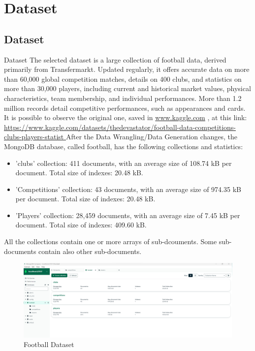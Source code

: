 \documentclass{Configuration_Files/PoliMi3i_thesis}
\begin{document}
\chapter{Dataset}
\label{ch:chapter_three}%

\section{Dataset}

Dataset
The selected dataset is a large collection of football data, derived primarily from Transfermarkt. Updated regularly, it offers accurate data on more than 60,000 global competition matches, details on 400 clubs, and statistics on more than 30,000 players, including current and historical market values, physical characteristics, team membership, and individual performances. More than 1.2 million records detail competitive performances, such as appearances and cards. It is possible to observe the original one, saved in \url{www.kaggle.com} , at this link:
\url{https://www.kaggle.com/datasets/thedevastator/football-data-competitions-clubs-players-statist }
After the Data Wrangling/Data Generation changes, the MongoDB database, called football, has the following collections and statistics:
\begin{itemize}
    \item 'clubs' collection: 411 documents, with an average size of 108.74 kB per document. Total size of indexes: 20.48 kB.
    \item 'Competitions' collection: 43 documents, with an average size of 974.35 kB per document. Total size of indexes: 20.48 kB.
    \item 'Players' collection: 28,459  documents, with an average size of 7.45 kB per document. Total size of indexes: 409.60 kB.
\end{itemize}
All the collections contain one or more arrays of sub-dcouments. Some sub-documents contain also other sub-documents.

\begin{figure}[htbp]
    \centering
    \includegraphics[scale=0.45]{Images/Dataset/football.png}
    \caption{Football Dataset}
\end{figure}
\newpage
\end{document}
